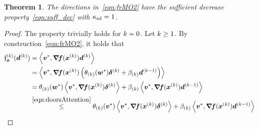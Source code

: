\documentclass{article}
\theoremstyle{plain}
\newtheorem{theorem}{Theorem}
\theoremstyle{definition}
\begin{document}
\begin{theorem}
	The directions in~\eqref{eqn:frMO2} have the 
	sufficient decrease property~\eqref{eqn:suff_dec}
	with $\kappa_{\mathrm{sd}} = 1$.
\end{theorem}

\begin{proof}
	The property trivially holds for $k=0$.
	Let $k \geq 1$.
	By construction~\eqref{eqn:frMO2}, it
	holds that
	\begin{align*}
		\funcXK(\vdK)
		&=
		\mul{\ve{v}^*}{\jacf(\vxK) \vdK}
		\\
		&=
		\mul{\ve{v}^*}{\jacf(\vxK)
		\args{
			\theta\kK(\ve w^*)
			\sdK
			+
			\beta\kK
			\vdKp
		}}
		\\
		&=
		\theta\kK(\ve w^*)
		\mul{\ve{v}^*}{\jacf(\vxK)\sdK}
		+
		\beta\kK
		\mul{\ve{v}^*}{\jacf(\vxK)\vdKp}
		\\
		&\stackrel{\eqref{eqn:doorsAttention}}\leq
		\theta\kK(\ve v^*)
		\mul{\ve{v}^*}{\jacf(\vxK)\sdK}
		+
		\beta\kK
		\mul{\ve{v}^*}{\jacf(\vxK)\vdKp}
		\\

\end{align*}
\end{proof}
\end{document}
